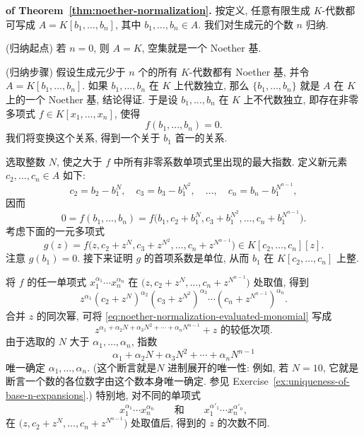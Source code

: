 \begin{Proof}\textbf{of Theorem~\ref{thm:noether-normalization}.}\quad
按定义, 任意有限生成 $K$-代数都可写成 $A=K[b_{1},\ldots,b_{n}]$, 其中 $b_{1},\ldots,b_{n}\in A$. 我们对生成元的个数 $n$ 归纳.

(归纳起点) 若 $n=0$, 则 $A=K$, 空集就是一个 Noether 基.

(归纳步骤) 假设生成元少于 $n$ 个的所有 $K$-代数都有 Noether 基, 并令 $A=K[b_{1},\ldots,b_{n}]$. 如果 $b_{1},\ldots,b_{n}$ 在 $K$ 上代数独立, 那么 $\{b_{1},\ldots,b_{n}\}$ 就是 $A$ 在 $K$ 上的一个 Noether 基, 结论得证. 于是设 $b_{1},\ldots,b_{n}$ 在 $K$ 上不代数独立, 即存在非零多项式 $f\in K[x_{1},\ldots,x_{n}]$, 使得
\[
  f(b_{1},\ldots,b_{n})=0.
\]
我们将变换这个关系, 得到一个关于 $b_{1}$ 首一的关系.

选取整数 $N$, 使之大于 $f$ 中所有非零系数单项式里出现的最大指数. 定义新元素 $c_{2},\ldots,c_{n}\in A$ 如下:
\[
  c_{2}=b_{2}-b_{1}^{N},\quad c_{3}=b_{3}-b_{1}^{N^{2}},\quad\ldots,\quad
  c_{n}=b_{n}-b_{1}^{N^{n-1}},
\]
因而
\[
  0=f(b_{1},\ldots,b_{n})
  =f\bigl(b_{1},c_{2}+b_{1}^{N},c_{3}+b_{1}^{N^{2}},\ldots,c_{n}+b_{1}^{N^{n-1}}\bigr).
\]
考虑下面的一元多项式
\[
  g(z)=f\bigl(z,c_{2}+z^{N},c_{3}+z^{N^{2}},\ldots,c_{n}+z^{N^{n-1}}\bigr)
  \in K[c_{2},\ldots,c_{n}][z].
\]
注意 $g(b_{1})=0$. 接下来证明 $g$ 的首项系数是单位, 从而 $b_{1}$ 在 $K[c_{2},\ldots,c_{n}]$ 上整.

将 $f$ 的任一单项式 $x_{1}^{\alpha_{1}}\cdots x_{n}^{\alpha_{n}}$ 在 $\bigl(z,c_{2}+z^{N},\ldots,c_{n}+z^{N^{n-1}}\bigr)$ 处取值, 得到
\begin{equation}\label{eq:noether-normalization-evaluated-monomial}
  z^{\alpha_{1}}(c_{2}+z^{N})^{\alpha_{2}}(c_{3}+z^{N^{2}})^{\alpha_{3}}
    \cdots(c_{n}+z^{N^{n-1}})^{\alpha_{n}}.
\end{equation}
合并 $z$ 的同次幂, 可将 \eqref{eq:noether-normalization-evaluated-monomial} 写成
\[
  z^{\alpha_{1}+\alpha_{2}N+\alpha_{3}N^{2}+\cdots+\alpha_{n}N^{n-1}}
  +\text{$z$ 的较低次项}.
\]
由于选取的 $N$ 大于 $\alpha_{1},\ldots,\alpha_{n}$, 指数
\[
  \alpha_{1}+\alpha_{2}N+\alpha_{3}N^{2}+\cdots+\alpha_{n}N^{n-1}
\]
唯一确定 $\alpha_{1},\ldots,\alpha_{n}$. (这个断言就是\textquotedbl{}$N$ 进制展开的唯一性\textquotedbl{}: 例如, 若 $N=10$, 它就是断言一个数的各位数字由这个数本身唯一确定. 参见 Exercise~\ref{ex:uniqueness-of-base-n-expansions}.) 特别地, 对不同的单项式
\[
  x_{1}^{\alpha_{1}}\cdots x_{n}^{\alpha_{n}}\qquad\text{和}\qquad
  x_{1}^{\alpha'_{1}}\cdots x_{n}^{\alpha'_{n}},
\]
在 $\bigl(z,c_{2}+z^{N},\ldots,c_{n}+z^{N^{n-1}}\bigr)$ 处取值后, 得到的 $z$ 的次数不同.


\end{Proof}
